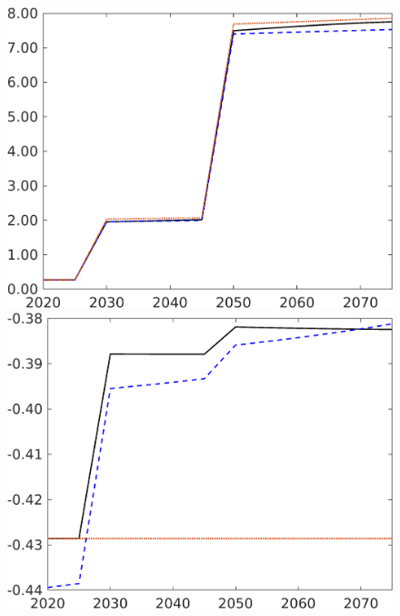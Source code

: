 \begin{figure}[h!!]
\begin{minipage}[]{0.32\textwidth}
\end{minipage}
\begin{minipage}[]{0.32\textwidth}
	\includegraphics[width=1\textwidth]{../../codding_model/own_basedOnFried/optimalPol_elastS_DisuSci/figures/all_1705/pf_CompEffOPT_T_NoTaus_spillover0_noskill1_sep1_BN0_ineq0_red0_etaa0.79_lgd0.png}
\end{minipage}
	\begin{minipage}[]{0.32\textwidth}
	\includegraphics[width=1\textwidth]{../../codding_model/own_basedOnFried/optimalPol_elastS_DisuSci/figures/all_1705/Utillab_CompEffOPT_T_NoTaus_spillover0_noskill1_sep1_BN0_ineq0_red0_etaa0.79_lgd0.png}

\end{minipage}
\end{figure}
